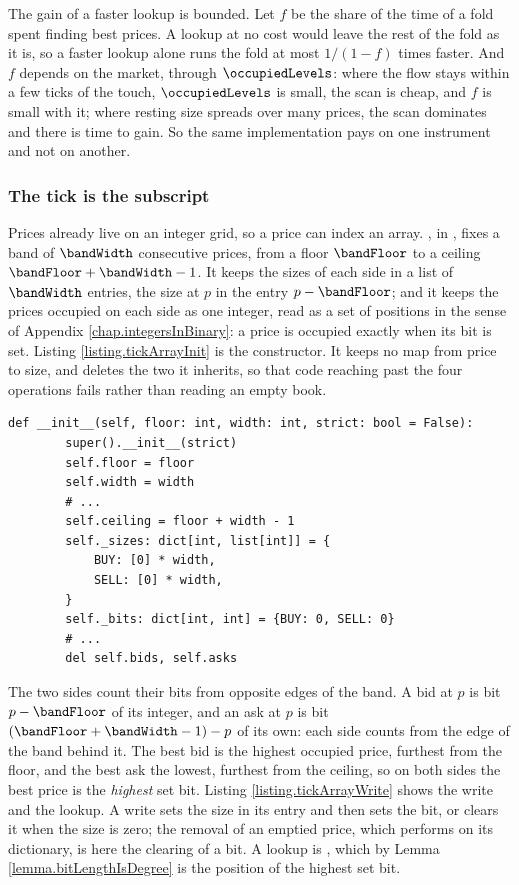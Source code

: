 The gain of a faster lookup is bounded.
Let $f$ be the share of the time of a fold spent finding best prices.
A lookup at no cost would leave the rest of the fold as it is,
so a faster lookup alone runs the fold at most $1/(1-f)$ times faster.
And $f$ depends on the market, through $\occupiedLevels$:
where the flow stays within a few ticks of the touch, $\occupiedLevels$ is small,
the scan is cheap, and $f$ is small with it;
where resting size spreads over many prices, the scan dominates and there is time to gain.
So the same implementation pays on one instrument and not on another.

\subsubsection{The tick is the subscript}

Prices already live on an integer grid, so a price can index an array.
, in , fixes a band of $\bandWidth$
consecutive prices, from a floor $\bandFloor$ to a ceiling $\bandFloor + \bandWidth - 1$.
It keeps the sizes of each side in a list of $\bandWidth$ entries,
the size at $p$ in the entry $p - \bandFloor$;
and it keeps the prices occupied on each side as one integer,
read as a set of positions in the sense of Appendix \ref{chap.integersInBinary}:
a price is occupied exactly when its bit is set.
Listing \ref{listing.tickArrayInit} is the constructor.
It keeps no map from price to size,
and deletes the two it inherits,
so that code reaching past the four operations fails rather than reading an empty book.

\begin{lstlisting}[caption={\protect\codehl{unito26.lob.orderbook.TickArrayBook.\_\_init\_\_}, with its comments elided.}, label=listing.tickArrayInit]
    def __init__(self, floor: int, width: int, strict: bool = False):
        super().__init__(strict)
        self.floor = floor
        self.width = width
        # ...
        self.ceiling = floor + width - 1
        self._sizes: dict[int, list[int]] = {
            BUY: [0] * width,
            SELL: [0] * width,
        }
        self._bits: dict[int, int] = {BUY: 0, SELL: 0}
        # ...
        del self.bids, self.asks
\end{lstlisting}

The two sides count their bits from opposite edges of the band.
A bid at $p$ is bit $p - \bandFloor$ of its integer,
and an ask at $p$ is bit $(\bandFloor + \bandWidth - 1) - p$ of its own:
each side counts from the edge of the band behind it.
The best bid is the highest occupied price, furthest from the floor,
and the best ask the lowest, furthest from the ceiling,
so on both sides the best price is the \emph{highest} set bit.
Listing \ref{listing.tickArrayWrite} shows the write and the lookup.
A write sets the size in its entry and then sets the bit, or clears it when the size is zero;
the removal of an emptied price, which  performs on its dictionary,
is here the clearing of a bit.
A lookup is ,
which by Lemma \ref{lemma.bitLengthIsDegree} is the position of the highest set bit.

